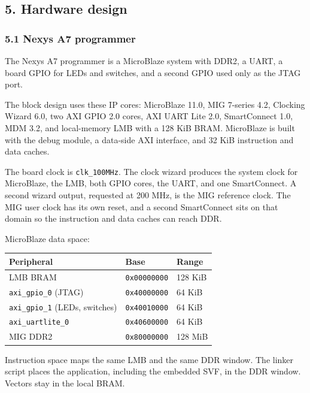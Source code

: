 \documentclass[
  11pt,
  a4paper,
]{article}
\newcounter{none} %
\begin{document}
\subsection{5. Hardware design}\label{hardware-design}

\subsubsection{5.1 Nexys A7 programmer}\label{nexys-a7-programmer}

The Nexys A7 programmer is a MicroBlaze system with DDR2, a UART, a
board GPIO for LEDs and switches, and a second GPIO used only as the
JTAG port.

The block design uses these IP cores: MicroBlaze 11.0, MIG 7-series 4.2,
Clocking Wizard 6.0, two AXI GPIO 2.0 cores, AXI UART Lite 2.0,
SmartConnect 1.0, MDM 3.2, and local-memory LMB with a 128 KiB BRAM.
MicroBlaze is built with the debug module, a data-side AXI interface,
and 32 KiB instruction and data caches.

The board clock is \texttt{clk\_100MHz}. The clock wizard produces the
system clock for MicroBlaze, the LMB, both GPIO cores, the UART, and one
SmartConnect. A second wizard output, requested at 200 MHz, is the MIG
reference clock. The MIG user clock has its own reset, and a second
SmartConnect sits on that domain so the instruction and data caches can
reach DDR.

MicroBlaze data space:

{\def\LTcaptype{none} %
\begin{longtable}[]{@{}lll@{}}
\toprule\noalign{}
Peripheral & Base & Range \\
\midrule\noalign{}
\endhead
\bottomrule\noalign{}
\endlastfoot
LMB BRAM & \texttt{0x00000000} & 128 KiB \\
\texttt{axi\_gpio\_0} (JTAG) & \texttt{0x40000000} & 64 KiB \\
\texttt{axi\_gpio\_1} (LEDs, switches) & \texttt{0x40010000} & 64 KiB \\
\texttt{axi\_uartlite\_0} & \texttt{0x40600000} & 64 KiB \\
MIG DDR2 & \texttt{0x80000000} & 128 MiB \\
\end{longtable}
}

Instruction space maps the same LMB and the same DDR window. The linker
script places the application, including the embedded SVF, in the DDR
window. Vectors stay in the local BRAM.
\end{document}
